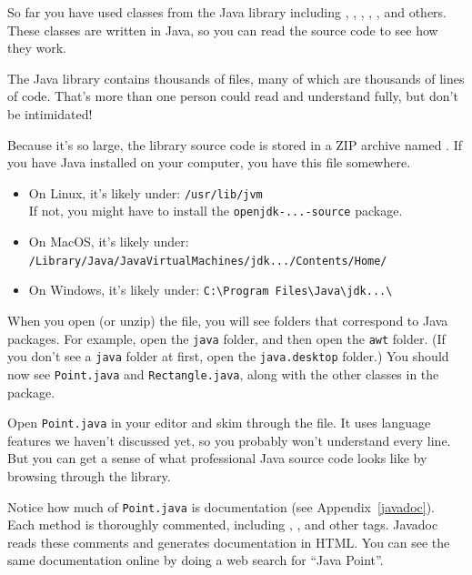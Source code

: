 
So far you have used classes from the Java library including , , , , , and others.
These classes are written in Java, so you can read the source code to see how they work.


The Java library contains thousands of files, many of which are thousands of lines of code.
That's more than one person could read and understand fully, but don't be intimidated!

Because it's so large, the library source code is stored in a ZIP archive named .
If you have Java installed on your computer, you have this file somewhere.

\begin{itemize}
\item On Linux, it's likely under: \verb"/usr/lib/jvm"
\\ If not, you might have to install the {\tt openjdk-...-source} package.

\item On MacOS, it's likely under: \\ \verb"/Library/Java/JavaVirtualMachines/jdk.../Contents/Home/"

\item On Windows, it's likely under: \verb"C:\Program Files\Java\jdk...\"
\end{itemize}

When you open (or unzip) the file, you will see folders that correspond to Java packages.
For example, open the {\tt java} folder, and then open the {\tt awt} folder.
(If you don't see a {\tt java} folder at first, open the {\tt java.desktop} folder.)
You should now see {\tt Point.java} and {\tt Rectangle.java}, along with the other classes in the  package.

Open {\tt Point.java} in your editor and skim through the file.
It uses language features we haven't discussed yet, so you probably won't understand every line.
But you can get a sense of what professional Java source code looks like by browsing through the library.


Notice how much of {\tt Point.java} is documentation (see Appendix~\ref{javadoc}).
Each method is thoroughly commented, including , , and other tags.
Javadoc reads these comments and generates documentation in HTML.
You can see the same documentation online by doing a web search for ``Java Point''.

